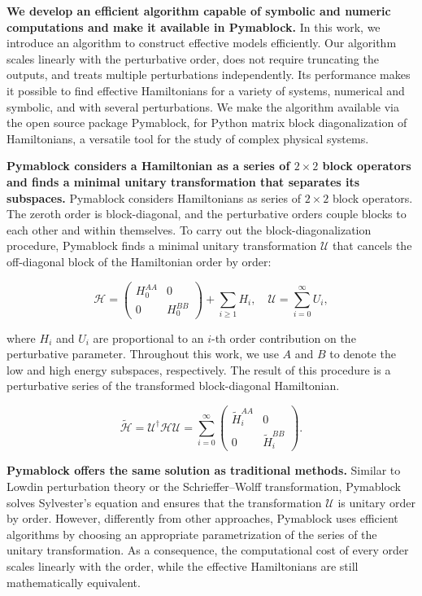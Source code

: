 \textbf{We develop an efficient algorithm capable of symbolic and numeric
computations and make it available in Pymablock.}
In this work, we introduce an algorithm to construct effective models
efficiently.
Our algorithm scales linearly with the perturbative order, does not require
truncating the outputs, and treats multiple perturbations independently.
Its performance makes it possible to find effective Hamiltonians for a variety
of systems, numerical and symbolic, and with several perturbations.
We make the algorithm available via the open source package Pymablock, for
Python matrix block diagonalization of Hamiltonians, a versatile tool for
the study of complex physical systems.

\textbf{Pymablock considers a Hamiltonian as a series of $2 \times 2$ block operators
and finds a minimal unitary transformation that separates its subspaces.}
Pymablock considers Hamiltonians as series of $2\times 2$ block operators.
The zeroth order is block-diagonal, and the perturbative orders couple
blocks to each other and within themselves.
To carry out the block-diagonalization procedure, Pymablock finds a minimal
unitary transformation $\mathcal{U}$ that cancels the off-diagonal block of the
Hamiltonian order by order:

\begin{equation}
\mathcal{H} = \begin{pmatrix}H_0^{AA} & 0 \\ 0 & H_0^{BB}\end{pmatrix} + \sum_{i\geq 1} H_i,\quad
\mathcal{U} = \sum_{i=0}^\infty U_i,
\end{equation}

where $H_i$ and $U_i$ are proportional to an $i$-th order
contribution on the perturbative parameter.
Throughout this work, we use $A$ and $B$ to denote the low and high energy
subspaces, respectively.
The result of this procedure is a perturbative series of the transformed
block-diagonal Hamiltonian.

\begin{equation}
\label{eq:transformed_hamiltonian}
\tilde{\mathcal{H}} = \mathcal{U}^\dagger \mathcal{H} \mathcal{U}=\sum_{i=0}^{\infty}
\begin{pmatrix}
\tilde{H}_i^{AA} & 0 \\
0 & \tilde{H}_i^{BB}
\end{pmatrix}.
\end{equation}

\textbf{Pymablock offers the same solution as traditional methods.}
Similar to Lowdin perturbation theory or the Schrieffer--Wolff transformation,
Pymablock solves Sylvester's equation and ensures that the transformation
$\mathcal{U}$ is unitary order by order.
However, differently from other approaches, Pymablock uses efficient algorithms
by choosing an appropriate parametrization of the series of the unitary
transformation.
As a consequence, the computational cost of every order scales linearly with
the order, while the effective Hamiltonians are still mathematically equivalent.
